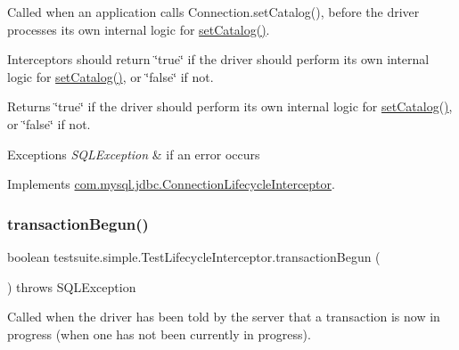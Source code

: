 Called when an application calls Connection.\+set\+Catalog(), before the driver processes its own internal logic for \mbox{\hyperlink{classtestsuite_1_1simple_1_1_test_lifecycle_interceptor_accae42bd1b1d7a51fa35a6f375bf4ce4}{set\+Catalog()}}.

Interceptors should return \char`\"{}true\char`\"{} if the driver should perform its own internal logic for \mbox{\hyperlink{classtestsuite_1_1simple_1_1_test_lifecycle_interceptor_accae42bd1b1d7a51fa35a6f375bf4ce4}{set\+Catalog()}}, or \char`\"{}false\char`\"{} if not.

\begin{DoxyReturn}{Returns}
\char`\"{}true\char`\"{} if the driver should perform its own internal logic for \mbox{\hyperlink{classtestsuite_1_1simple_1_1_test_lifecycle_interceptor_accae42bd1b1d7a51fa35a6f375bf4ce4}{set\+Catalog()}}, or \char`\"{}false\char`\"{} if not.
\end{DoxyReturn}

\begin{DoxyExceptions}{Exceptions}
{\em S\+Q\+L\+Exception} & if an error occurs \\
\hline
\end{DoxyExceptions}


Implements \mbox{\hyperlink{interfacecom_1_1mysql_1_1jdbc_1_1_connection_lifecycle_interceptor_a1b4e6d4cd345e6ac103df4cc0d6807a1}{com.\+mysql.\+jdbc.\+Connection\+Lifecycle\+Interceptor}}.

\mbox{\label{classtestsuite_1_1simple_1_1_test_lifecycle_interceptor_a5ca18da030f4569891254990898f9c1b}} 
\subsubsection{\texorpdfstring{transaction\+Begun()}{transactionBegun()}}
{\footnotesize\ttfamily boolean testsuite.\+simple.\+Test\+Lifecycle\+Interceptor.\+transaction\+Begun (\begin{DoxyParamCaption}{ }\end{DoxyParamCaption}) throws S\+Q\+L\+Exception}

Called when the driver has been told by the server that a transaction is now in progress (when one has not been currently in progress). 

